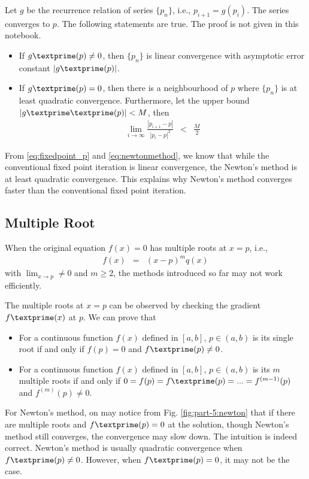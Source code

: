 Let $g$ be the recurrence relation of series $\{p_n\}$, i.e., $p_{i+1} = g(p_i)$. The series converges to $p$. The following statements are true. The proof is not given in this notebook.
\begin{itemize}
  \item If $g\textprime(p)\neq0$, then $\{p_n\}$ is linear convergence with asymptotic error constant $|g\textprime(p)|$.
  \item If $g\textprime(p)=0$, then there is a neighbourhood of $p$ where $\{p_n\}$ is at least quadratic convergence. Furthermore, let the upper bound $|g\textprime\textprime(p)| < M$, then
  \begin{eqnarray}
  \lim_{i\rightarrow\infty} \frac{|p_{i+1}-p|}{|p_i-p|^2} &<& \frac{M}{2} \nonumber
\end{eqnarray}
\end{itemize} 


From \eqref{eq:fixedpoint_p} and \eqref{eq:newtonmethod}, we know that while the conventional fixed point iteration is linear convergence, the Newton's method is at least quadratic convergence. This explains why Newton's method converges faster than the conventional fixed point iteration.

\subsection{Multiple Root}

When the original equation $f(x)=0$ has multiple roots at $x=p$, i.e.,
\begin{eqnarray}
  f(x) &=& (x-p)^mq(x) \nonumber
\end{eqnarray}
with $\lim_{x\rightarrow p} \neq 0$ and $m\geq 2$, the methods introduced so far may not work efficiently.

The multiple roots at $x=p$ can be observed by checking the gradient $f\textprime(x)$ at $p$. We can prove that
\begin{itemize}
  \item For a continuous function $f(x)$ defined in $[a, b]$, $p\in(a,b)$ is its single root if and only if $f(p)=0$ and $f\textprime(p)\neq 0$.
  \item For a continuous function $f(x)$ defined in $[a, b]$, $p\in(a,b)$ is its $m$ multiple roots if and only if $0=f(p)=f\textprime(p)=...=f^{(m-1)}(p)$ and $f^{(m)}(p)\neq 0$.
\end{itemize}

For Newton's method, on may notice from Fig. \ref{fig:part-5:newton} that if there are multiple roots and $f\textprime(p)=0$ at the solution, though Newton's method still converges, the convergence may slow down. The intuition is indeed correct. Newton's method is usually quadratic convergence when $f\textprime(p)\neq 0$. However, when $f\textprime(p)=0$, it may not be the case.

